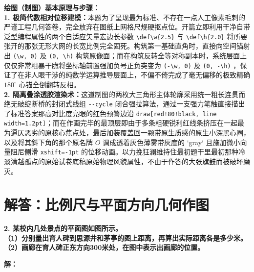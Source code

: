 \vspace{0.6cm}

{\small\color{blue!70!black}
\textbf{绘图（制图）基本原理与步骤：}\\
\textbf{1. 极简代数相对位移建模：}本题为了呈现最为标准、不存在一点人工像素毛刺的严谨工程几何答卷，完全放弃在图纸上网格尺规硬抠点位。开篇立即利用干净自带泛型编程属性的两个自适应矢量宏边长参数 \texttt{\textbackslash def\textbackslash w\{2.5\}} 与 \texttt{\textbackslash def\textbackslash h\{2.0\}} 将所要张开的那张无形大网的长宽比例完全固死。构筑第一基础直角时，直接向空间锚射出 \texttt{(\textbackslash w, 0)} 及 \texttt{(0, \textbackslash h)} 构筑原像面；而在构筑反转全等对称副本时，系统层面上仅仅非常粗暴干脆将坐标轴前置强加负号正负突变为 \texttt{(-\textbackslash w, 0)} 及 \texttt{(0, -\textbackslash h)} ，保证了在非人眼干涉的纯数学运算推导层面上，不偏不倚完成了毫无偏移的极致精确 $180^\circ$ 心锚全倒翻转反相。\\
\textbf{2. 隔离叠涂透胶渲染术：}这道制图的两枚大三角形主体轮廓采用统一粗长连贯而绝无破绽断桥的封闭式线组 \texttt{-{}-cycle} 闭合强拉算法，通过一支强力笔触直接描出了标准答案那高对比度亮眼的红色预警边沿 \texttt{draw[red!80!black, line width=1.2pt]}；而在作画完毕的最顶层即由于多条粗硬锐利红线条挤压在一起最为逼仄恶劣的原核心焦点处，最后加装覆盖回一颗带原生质感的原生小深黑心圈，以及将其斜下角的那个原名牌 $O$ 调成透着灰色薄雾带灰度的 `gray` 且施加微小向量阻尼侧滑 \texttt{xshift=-1pt} 的位移动画。以力挽狂澜维持住最初题干里最初那种冷淡清越孤点的原始试卷底稿原始物理风貌属性，不由于作答的大张旗鼓而被破坏磨灭。
}

\newpage



\section{解答：比例尺与平面方向几何作图}

\vspace{0.6cm}

\textbf{2. 某校内几处景点的平面图如图所示。}\\
\textbf{（1）分别量出育人碑到思源井和茅亭的图上距离，再算出实际距离各是多少米。}\\
\textbf{（2）画廊在育人碑正东方向300米处，在图中表示出画廊的位置。}

\vspace{0.4cm}

\textbf{解：}

